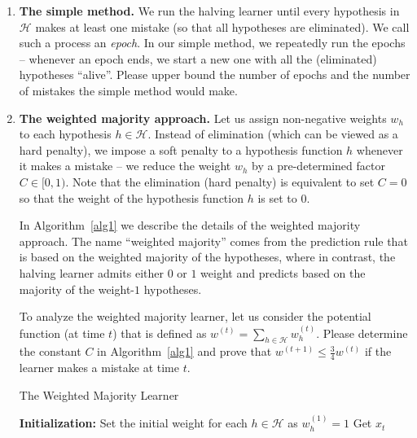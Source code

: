 \documentclass[12pt,letterpaper]{article}
\def \H{\mathcal H}
\begin{document}
\begin{enumerate}

\begin{enumerate}[label=(\alph*)]
    \item {\bf The simple method.} We run the halving learner until every hypothesis in $\H$ makes at least one mistake (so that all hypotheses are eliminated). We call such a process an \emph{epoch}. In our simple method, we repeatedly run the epochs -- whenever an epoch ends, we start a new one with all the (eliminated) hypotheses ``alive''. Please upper bound the number of epochs and the number of mistakes the simple method would make.
    
    \item{\bf The weighted majority approach.} Let us assign non-negative weights $w_h$ to each hypothesis $h \in \H$. Instead of elimination (which can be viewed as a hard penalty), we impose a soft penalty to a hypothesis function $h$ whenever it makes a mistake -- we reduce the weight $w_h$ by a pre-determined factor $C \in [0, 1)$. Note that the elimination (hard penalty) is equivalent to set $C = 0$ so that the weight of the hypothesis function $h$ is set to $0$.
    
    In Algorithm~\ref{alg1} we describe the details of the weighted majority approach. The name ``weighted majority'' comes from the prediction rule that is based on the weighted majority of the hypotheses, where in contrast, the halving learner admits either $0$ or $1$ weight and predicts based on the majority of the weight-$1$ hypotheses.
    
    To analyze the weighted majority learner, let us consider the potential function (at time $t$) that is defined as  $w^{(t)}=\sum_{h\in\H}w_h^{(t)}$. Please determine the constant $C$ in Algorithm~\ref{alg1} and prove that $w^{(t+1)}\leq\frac{3}{4}w^{(t)}$ if the learner makes a  mistake at time $t$.
\begin{algorithm}[h]
\caption{The Weighted Majority Learner}
\label{alg1}
\begin{algorithmic}[1]
    \State \textbf{Initialization:} Set the initial weight for each $h\in\H$ as $w_h^{(1)}=1$
      \State Get $x_t$


\end{algorithmic}
\end{algorithm}
\end{enumerate}
\end{enumerate}
\end{document}
